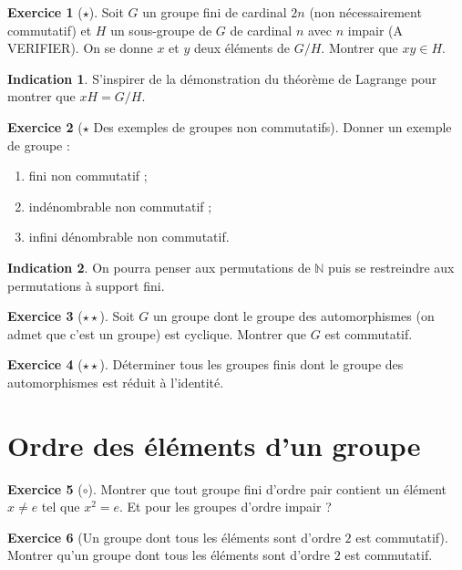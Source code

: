 \documentclass[french]{book}
\newcommand{\N}{\mathbb{N}}
\theoremstyle{definition}
\newtheorem{ex}{Exercice}[chapter]
\theoremstyle{theorem}
\newtheorem*{ind}{Indication}
\theoremstyle{remark}
\begin{document}
\begin{ex}[$\star$]
	Soit $G$ un groupe fini de cardinal $2n$ (non nécessairement commutatif) et $H$ un sous-groupe de $G$ de cardinal $n$ avec $n$ impair (A VERIFIER). On se donne $x$ et $y$ deux éléments de $G/H$. Montrer que $xy\in H$.
\end{ex}

\begin{ind}
	S'inspirer de la démonstration du théorème de Lagrange pour montrer que $xH=G/H$.
\end{ind}

\begin{ex}[$\star$ Des exemples de groupes non commutatifs]
	Donner un exemple de groupe : 
	\begin{enumerate}
		\item fini non commutatif ;
		\item indénombrable non commutatif ;
		\item infini dénombrable non commutatif.
	\end{enumerate}
\end{ex}

\begin{ind}
	On pourra penser aux permutations de $\N$ puis se restreindre aux permutations à support fini.
\end{ind}

\begin{ex}[$\star\star$]
	Soit $G$ un groupe dont le groupe des automorphismes (on admet que c'est un groupe) est cyclique. Montrer que $G$ est commutatif.
\end{ex}

\begin{ex}[$\star\star$]
	Déterminer tous les groupes finis dont le groupe des automorphismes est réduit à l'identité.
\end{ex}

\section{Ordre des éléments d'un groupe}

\begin{ex}[$\circ$]
	Montrer que tout groupe fini d'ordre pair contient un élément $x\ne e$ tel que $x^2=e$. Et pour les groupes d'ordre impair ?
\end{ex}

\begin{ex}[Un groupe dont tous les éléments sont d'ordre $2$ est commutatif]
	Montrer qu'un groupe dont tous les éléments sont d'ordre $2$ est commutatif.
\end{ex}
\end{document}
